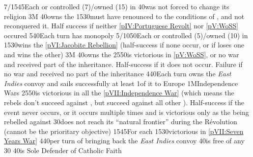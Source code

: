 %
{7/15}{45}{Each \TP or \COL controlled (7)/owned (15) in \continentCaraibes}%
%
%
{}{40}{\ANG was not forced to change its religion}%
%
\EUobjective3M{}{}%
{}{40}{\ANG owns the }%
%
%
{15}{30}{\HIS must have renounced to the conditions of , and not reconquered it. Half success if neither
  \ref{pIV:Portuguese Revolt} nor \ref{pV:WoSS} occured}%
%
%
{5}{40}{Each turn \ANG has  monopoly}%
%
%
%
{5/10}{50}{Each \TP or \COL controlled (5)/owned (10) in \continentCaraibes}%
%
%
{15}{30}{\ANG wins the \ref{pVI:Jacobite Rebellion} (half-success if none
  occur, or if loses one and wins the other)}%
%
\EUobjective3M{}{}%
{}{40}{\ANG owns the }%
%
%
{25}{50}{\ANG is victorious in \ref{pV:WoSS}, or no war and \ANG received part
  of the inheritance. Half-success if it does not occur. Failure if no war and
  \ANG received no part of the inheritance}%
%
%
{4}{40}{Each turn \ANG owns the \emph{East Indies} convoy and sails
  successfully at least 1\NTD of it to Europe}%
%
%
\EUobjective1M{Independence Wars}{}%
{25}{50}{\ANG is victorious in all the \ref{pVII:Independence War} (which
  means the rebels don't succeed against \ANG, but succeed against all other
  \MAJ). Half-success if the event never occurs, or it occurs multiple times
  and \ANG is victorious only as the \MAJ being rebelled against }%
%
%
{}{30}{\paysmajeurFrance does not reach its ``natural frontier'' during the
  Révolution (cannot be the prioritary objective)}%
%
%
{15}{45}{For each }%
%
%
{15}{30}{\ANG victorious in \ref{pVII:Seven Years War}}%
%
%
{4}{40}{per turn of bringing back the \emph{East Indies} convoy}%
%
%
%
 
%
%
{}{40}{\provincePicardie is free of any \Presidio}%
%
%
%
{}{30}{}%
%
%
{}{40}{\FRA is Sole Defender of Catholic Faith}%

